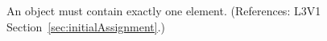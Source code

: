 An \InitialAssignment object must contain exactly one  element.
(References: L3V1 Section~\ref{sec:initialAssignment}.)
